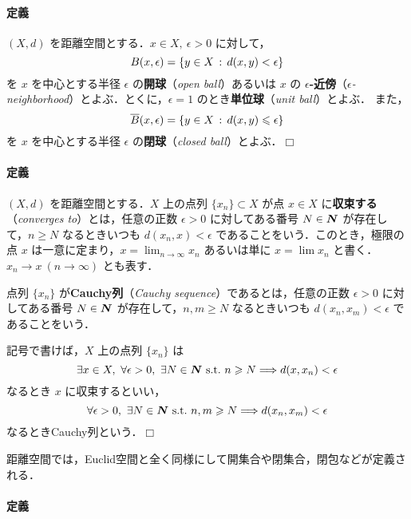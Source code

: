 \documentclass[pandoc,base=10pt,b5j,precisetext]{bxjsarticle}
\let\oldparagraph\paragraph
\renewcommand{\paragraph}[1]{\oldparagraph{#1}\mbox{}}
\def\lt{<}
\begin{document}
\hypertarget{open-disk}{%
\paragraph{定義}\label{open-disk}}

\((X, d)\) を距離空間とする．\(x \in X,\ \epsilon > 0\) に対して， \[
B(x, \epsilon) = \{ y \in X \deli d(x, y) \lt \epsilon \}
\] を \(x\) を中心とする半径 \(\epsilon\) の\textbf{開球}（\emph{open
ball}）あるいは \(x\) の
\textbf{\(\epsilon\)-近傍}（\emph{\(\epsilon\)-neighborhood}）とよぶ．とくに，\(\epsilon = 1\)
のとき\textbf{単位球}（\emph{unit ball}）とよぶ． また， \[
\overline{B}(x, \epsilon) = \{ y \in X \,:\, d(x, y) \leqslant \epsilon \}
\] を \(x\) を中心とする半径 \(\epsilon\) の\textbf{閉球}（\emph{closed
ball}）とよぶ．\(\Box\)

\hypertarget{sequence-limit}{%
\paragraph{定義}\label{sequence-limit}}

\((X, d)\) を距離空間とする．\(X\) 上の点列 \(\{ x_n \} \subset X\) が点
\(x \in X\) に\textbf{収束する}（\emph{converges to}）とは，任意の正数
\(\epsilon > 0\) に対してある番号 \(N \in \boldsymbol{N}\)
が存在して，\(n \ge N\) なるときいつも \(d(x_n, x) \lt \epsilon\)
であることをいう．このとき，極限の点 \(x\)
は一意に定まり，\(x = \lim_{n \to \infty} x_n\) あるいは単に
\(x = \lim x_n\) と書く．\(x_n \to x \ (n \to \infty)\) とも表す．

点列 \(\{ x_n \}\) が\textbf{Cauchy列}（\emph{Cauchy
sequence}）であるとは，任意の正数 \(\epsilon > 0\) に対してある番号
\(N \in \boldsymbol{N}\) が存在して，\(n, m \ge N\) なるときいつも
\(d(x_n, x_m) \lt \epsilon\) であることをいう．

記号で書けば，\(X\) 上の点列 \(\{ x_n \}\) は \[
\exists x \in X,\ \forall \epsilon > 0,\ \exists N \in \bb N \ \text{s.t.}\ n \ge N \Longrightarrow d(x, x_n) \lt \epsilon
\] なるとき \(x\) に収束するといい， \[
\forall \epsilon > 0,\ \exists N \in \bb N \ \text{s.t.}\ n, m \ge N \Longrightarrow d(x_n, x_m) \lt \epsilon
\] なるときCauchy列という．\(\Box\)

距離空間では，Euclid空間と全く同様にして開集合や閉集合，閉包などが定義される．

\hypertarget{open-set-with-metric}{%
\paragraph{定義}\label{open-set-with-metric}}
\end{document}

